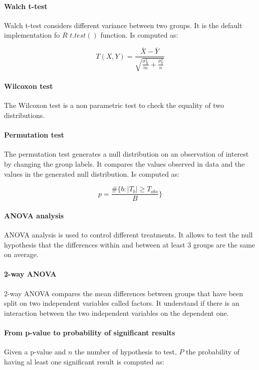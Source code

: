 			\paragraph{Walch t-test}
			Walch t-test considers different variance between two groups.
			It is the default implementation fo $R$ $t.test()$ function.
			Is computed as:

			$$T(X, Y) = \frac{\bar{X}-\bar{Y}}{\sqrt{\frac{\sigma^2_{X}}{m}+\frac{\sigma^2_Y}{n}}}$$

			\paragraph{Wilcoxon test}
			The Wilcoxon test is a non parametric test to check the equality of two distributions.

			\paragraph{Permutation test}
			The permutation test generates a null distribution on an observation of interest by changing the group labels.
			It compares the values observed in data and the values in the generated null distribution.
			Is computed as:

			$$p = \frac{\#\{b:|T_b|\ge T_{obs}}{B}\}$$

			\paragraph{ANOVA analysis}
			ANOVA analysis is used to control different treatments.
			It allows to test the null hypothesis that the differences within and between at least $3$ groups are the same on average.

			\paragraph{2-way ANOVA}
			2-way ANOVA compares the mean differences between groups that have been split on two independent variables called factors.
			It understand if there is an interaction between the two independent variables on the dependent one.

			\paragraph{From p-value to probability of significant results}
			Given a p-value and $n$ the number of hypothesis to test, $P$ the probability of having al least one significant result is computed as:


